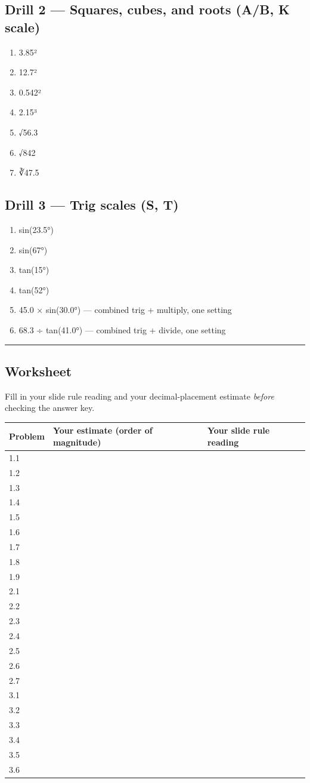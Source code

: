 \documentclass[
  10pt,
]{article}
\providecommand{\tightlist}{%
  \setlength{\itemsep}{0pt}\setlength{\parskip}{0pt}}
\begin{document}
\hypertarget{drill-2-squares-cubes-and-roots-ab-k-scale}{%
\subsection{Drill 2 --- Squares, cubes, and roots (A/B, K
scale)}\label{drill-2-squares-cubes-and-roots-ab-k-scale}}

\begin{enumerate}
\def\labelenumi{\arabic{enumi}.}
\tightlist
\item
  3.85²
\item
  12.7²
\item
  0.542²
\item
  2.15³
\item
  √56.3
\item
  √842
\item
  ∛47.5
\end{enumerate}

\hypertarget{drill-3-trig-scales-s-t}{%
\subsection{Drill 3 --- Trig scales (S,
T)}\label{drill-3-trig-scales-s-t}}

\begin{enumerate}
\def\labelenumi{\arabic{enumi}.}
\tightlist
\item
  sin(23.5°)
\item
  sin(67°)
\item
  tan(15°)
\item
  tan(52°)
\item
  45.0 × sin(30.0°) --- combined trig + multiply, one setting
\item
  68.3 ÷ tan(41.0°) --- combined trig + divide, one setting
\end{enumerate}

\begin{center}\rule{0.5\linewidth}{0.5pt}\end{center}

\hypertarget{worksheet}{%
\subsection{Worksheet}\label{worksheet}}

Fill in your slide rule reading and your decimal-placement estimate
\emph{before} checking the answer key.

\begin{longtable}[]{@{}lll@{}}
\toprule
Problem & Your estimate (order of magnitude) & Your slide rule
reading\tabularnewline
\midrule
\endhead
1.1 & &\tabularnewline
1.2 & &\tabularnewline
1.3 & &\tabularnewline
1.4 & &\tabularnewline
1.5 & &\tabularnewline
1.6 & &\tabularnewline
1.7 & &\tabularnewline
1.8 & &\tabularnewline
1.9 & &\tabularnewline
2.1 & &\tabularnewline
2.2 & &\tabularnewline
2.3 & &\tabularnewline
2.4 & &\tabularnewline
2.5 & &\tabularnewline
2.6 & &\tabularnewline
2.7 & &\tabularnewline
3.1 & &\tabularnewline
3.2 & &\tabularnewline
3.3 & &\tabularnewline
3.4 & &\tabularnewline
3.5 & &\tabularnewline
3.6 & &\tabularnewline
\bottomrule
\end{longtable}
\end{document}
